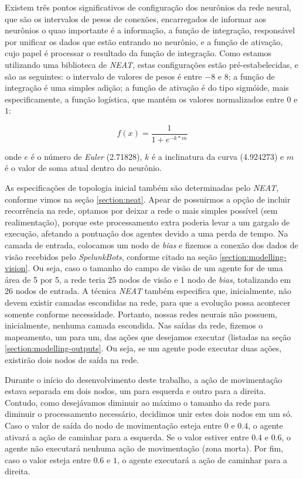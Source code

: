 Existem três pontos significativos de configuração dos neurônios da rede neural,
que são os intervalos de pesos de conexões, encarregados de informar aos
neurônios o quao importante é a informação, a função de integração, responsável
por unificar os dados que estão entrando no neurônio, e a função de ativação,
cujo papel é processar o resultado da função de integração. Como estamos
utilizando uma biblioteca de \textit{NEAT}, estas configurações estão
pré-estabelecidas, e são as seguintes: o intervalo de valores de pesos é entre
$-8$ e $8$; a função de integração é uma simples adição; a função de ativação é
do tipo sigmóide, mais especificamente, a função logística, que mantém os
valores normalizados entre $0$ e $1$:

\begin{equation}
	\label{eq:neat-activation}
	f(x) = \frac{1}{1+e^{-k*m}}
\end{equation}

onde $e$ é o número de \textit{Euler} (2.71828), $k$ é a inclinatura da curva
(4.924273) e $m$ é o valor de soma atual dentro do neurônio.

As especificações de topologia inicial também são determinadas pelo
\textit{NEAT}, conforme vimos na seção \ref{section:neat}. Apear de possuirmos a
opção de incluir recorrência na rede, optamos por deixar a rede o mais simples
possível (sem realimentação), porque este processamento extra poderia levar a um
gargalo de execução, afetando a pontuação dos agentes devido a uma perda de
tempo. Na camada de entrada, colocamos um nodo de \textit{bias} e  fizemos a
conexão dos dados de visão recebidos pelo \textit{SpelunkBots}, conforme citado
na seção \ref{section:modelling-vision}. Ou seja, caso o tamanho do campo de
visão de um agente for de uma área de 5 por 5, a rede teria 25 nodos de visão e
1 nodo de \textit{bias}, totalizando em 26 nodos de entrada. A técnica
\textit{NEAT} também especifica que, inicialmente, não devem existir camadas
escondidas na rede, para que a evolução possa acontecer somente conforme
necessidade. Portanto, nossas redes neurais não possuem, inicialmente, nenhuma
camada escondida. Nas saídas da rede, fizemos o mapeamento, um para um, das
ações que desejamos executar (listadas na seção \ref{section:modelling-outputs}.
Ou seja, se um agente pode executar duas ações, existirão dois nodos de saída na
rede.

Durante o início do desenvolvimento deste trabalho, a ação de movimentação
estava separada em dois nodos, um para esquerda e outro para a direita. Contudo,
como desejávamos diminuir ao máximo o tamanho da rede para diminuir o
processamento necessário, decidimos unir estes dois nodos em um só. Caso o valor
de saída do nodo de movimentação esteja entre $0$ e $0.4$, o agente ativará a
ação de caminhar para a esquerda. Se o valor estiver entre $0.4$ e $0.6$, o
agente não executará nenhuma ação de movimentação (zona morta). Por fim, caso o
valor esteja entre $0.6$ e $1$, o agente executará a ação de caminhar para a
direita.

